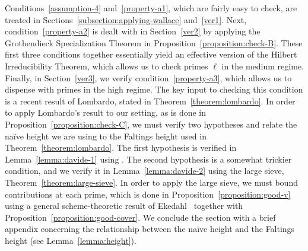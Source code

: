 Conditions~\ref{assumption-4} and~\ref{property-a1}, which are fairly easy to check, are treated in Sections~\ref{subsection:applying-wallace} and~\ref{ver1}. Next, condition~\ref{property-a2}
 is dealt with in Section~\ref{ver2} by applying the Grothendieck Specialization Theorem in
 Proposition~\ref{proposition:check-B}.
These first three conditions together essentially yield an effective
version of the Hilbert Irreducibility Theorem, which allows us to
check primes $\ell$ in the medium regime. Finally, in Section~\ref{ver3}, we verify condition~\ref{property-a3},
which allows us to dispense with primes in the high regime.
The key input to checking this condition is a recent result of Lombardo,
stated in Theorem~\ref{theorem:lombardo}.
In order to apply Lombardo's result to our setting,
as is done in Proposition~\ref{proposition:check-C}, we must verify two hypotheses and relate the na\"{i}ve height we are using to the Faltings height used in Theorem~\ref{theorem:lombardo}.
The first hypothesis is verified in Lemma~\ref{lemma:davide-1}
using \cite[Proposition 5]{ellenbergEHK:non-simple-abelian-varieties-in-a-family}.
The second hypothesis is a somewhat trickier condition, and we verify it in Lemma~\ref{lemma:davide-2} using the large sieve,
Theorem~\ref{theorem:large-sieve}.
In order to apply the large sieve, we must bound contributions at
each prime, which is done in
Proposition~\ref{proposition:good-v} using a general scheme-theoretic
result of Ekedahl~\cite[Lemma 1.2]{ekedahl1988effective}
together with Proposition~\ref{proposition:good-cover}.
We conclude the section with a brief appendix concerning the relationship between the na\"{i}ve height and the Faltings height (see Lemma~\ref{lemma:height}).

